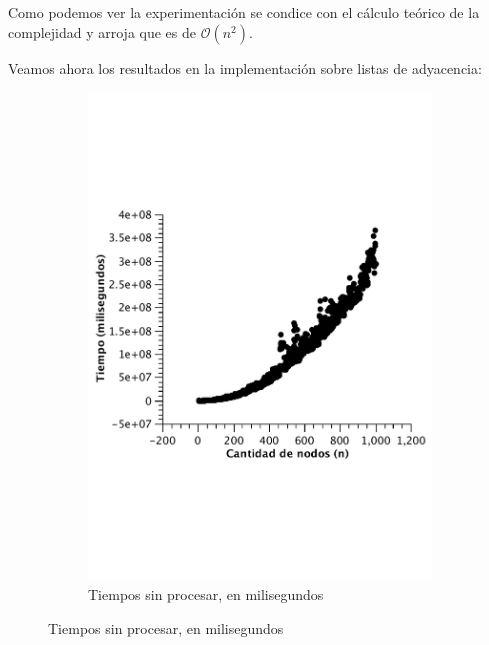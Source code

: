 Como podemos ver la experimentación se condice con el cálculo teórico de la complejidad y arroja que es de $\mathcal{O}(n^2)$.

Veamos ahora los resultados en la implementación sobre listas de adyacencia:

\begin{figure}[H]
        \centering
\begin{subfigure}[b]{0.5\textwidth}
                \includegraphics[width=\textwidth]{imagenes/completo-listas-1.pdf}
                \caption{Tiempos sin procesar, en milisegundos}
        \end{subfigure}%


\end{figure}
